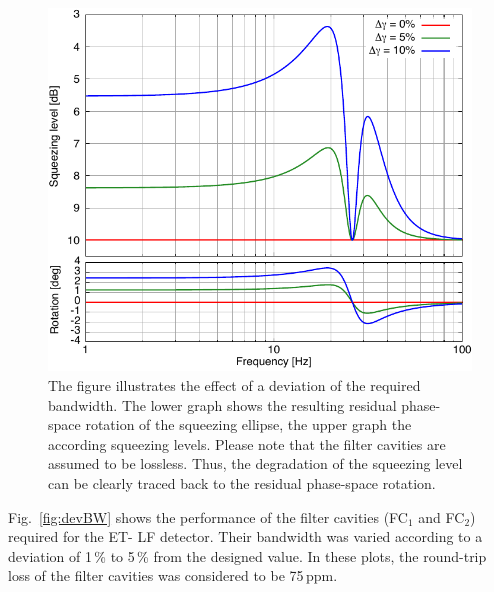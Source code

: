 \begin{figure}
\centering
\includegraphics{./Sec_Optics/FCs-devbw-10-20-rotAI.pdf}
\caption{The figure illustrates the effect of a deviation of the required bandwidth. The lower graph shows the resulting residual phase-space rotation of the squeezing ellipse, the upper graph the according squeezing levels. Please note that the filter cavities are assumed to be lossless. Thus, the degradation of the squeezing level can be clearly traced back to the residual phase-space rotation.}
\label{fig:devBWll}
\end{figure}

Fig.~\ref{fig:devBW} shows the performance of the filter cavities (FC$_1$ and FC$_2$)  required for the ET- LF detector. Their bandwidth was varied according to a deviation of 1\,\% to 5\,\% from the designed value. In these plots, the round-trip loss of the filter cavities was considered to be 75\,ppm.

